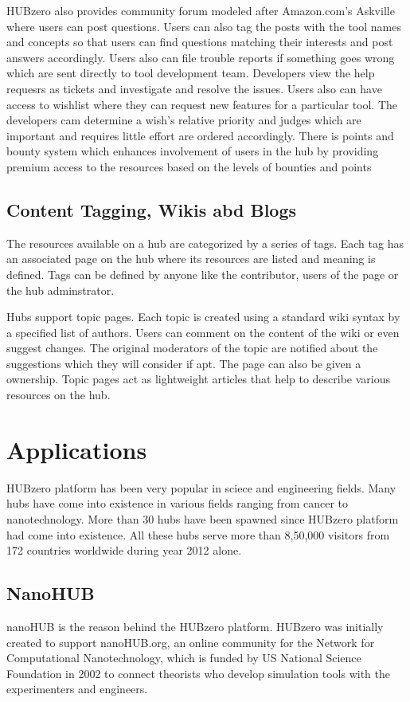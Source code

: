 \documentclass[9pt,twocolumn,twoside]{../../styles/osajnl}
\begin{document}
HUBzero also provides community forum modeled after Amazon.com's
Askville where users can post questions. Users can also tag the posts
with the tool names and concepts so that users can find questions
matching their interests and post answers accordingly. Users also can
file trouble reports if something goes wrong which are sent directly
to tool development team. Developers view the help requesrs as tickets
and investigate and resolve the issues. Users also can have access to
wishlist where they can request new features for a particular
tool. The developers cam determine a wish's relative priority and
judges which are important and requires little effort are ordered
accordingly. There is points and bounty system which enhances
involvement of users in the hub by providing premium access to the
resources based on the levels of bounties and points

\subsection{Content Tagging, Wikis abd Blogs}
The resources available on a hub are categorized by a series of
tags. Each tag has an associated page on the hub where its resources
are listed and meaning is defined. Tags can be defined by anyone like
the contributor, users of the page or the hub adminstrator.

Hubs support topic pages. Each topic is created using a standard wiki
syntax by a specified list of authors. Users can comment on the
content of the wiki or even suggest changes. The original moderators
of the topic are notified about the suggestions which they will
consider if apt. The page can also be given a ownership. Topic pages
act as lightweight articles that help to describe various resources on
the hub\cite{hubzerofeatures}.

\section{Applications}
HUBzero platform has been very popular in sciece and engineering
fields. Many hubs have come into existence in various fields ranging
from cancer to nanotechnology. More than 30 hubs have been spawned
since HUBzero platform had come into existence. All these hubs serve
more than 8,50,000 visitors from 172 countries worldwide during year
2012 alone.

\subsection{NanoHUB}
nanoHUB is the reason behind the HUBzero platform. HUBzero was
initially created to support nanoHUB.org, an online community for the
Network for Computational Nanotechnology, which is funded by US
National Science Foundation in 2002 to connect theorists who develop
simulation tools with the experimenters and engineers.
\end{document}
